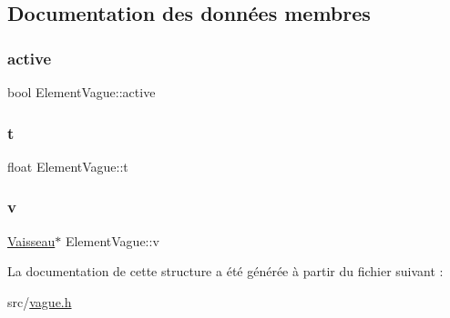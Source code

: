 \subsection{Documentation des données membres}
\mbox{\label{struct_element_vague_ab0bd206a38ece486f6f5bb9ec76ff36b}} 
\subsubsection{\texorpdfstring{active}{active}}
{\footnotesize\ttfamily bool Element\+Vague\+::active}

\mbox{\label{struct_element_vague_af6645ffc5fbc3be59dbf5063a78f8e36}} 
\subsubsection{\texorpdfstring{t}{t}}
{\footnotesize\ttfamily float Element\+Vague\+::t}

\mbox{\label{struct_element_vague_a74ef9460cb2ccf37f07caa28b48959ec}} 
\subsubsection{\texorpdfstring{v}{v}}
{\footnotesize\ttfamily \hyperlink{class_vaisseau}{Vaisseau}$\ast$ Element\+Vague\+::v}



La documentation de cette structure a été générée à partir du fichier suivant \+:\begin{DoxyCompactItemize}
\item 
src/\hyperlink{vague_8h}{vague.\+h}\end{DoxyCompactItemize}
